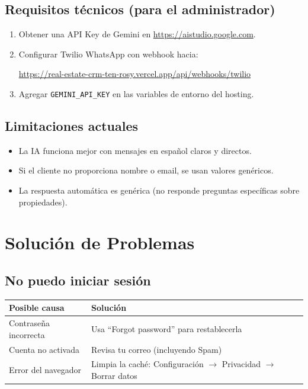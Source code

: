 \documentclass[12pt,oneside]{article}
\begin{document}
\subsection{Requisitos técnicos (para el administrador)}

\begin{enumerate}[leftmargin=*]
  \item Obtener una API Key de Gemini en \url{https://aistudio.google.com}.
  \item Configurar Twilio WhatsApp con webhook hacia:
  \begin{center}
  \url{https://real-estate-crm-ten-rosy.vercel.app/api/webhooks/twilio}
  \end{center}
  \item Agregar \texttt{GEMINI\_API\_KEY} en las variables de entorno del hosting.
\end{enumerate}

\subsection{Limitaciones actuales}

\begin{itemize}[leftmargin=*]
  \item La IA funciona mejor con mensajes en español claros y directos.
  \item Si el cliente no proporciona nombre o email, se usan valores genéricos.
  \item La respuesta automática es genérica (no responde preguntas específicas sobre propiedades).
\end{itemize}

\section{Solución de Problemas}

\subsection{No puedo iniciar sesión}

\begin{tabularx}{\textwidth}{|X|X|}
\hline
\rowcolor{primary!10}
\textbf{Posible causa} & \textbf{Solución} \\
\hline
Contraseña incorrecta & Usa “Forgot password” para restablecerla \\
\hline
Cuenta no activada & Revisa tu correo (incluyendo Spam) \\
\hline
Error del navegador & Limpia la caché: Configuración $\rightarrow$ Privacidad $\rightarrow$ Borrar datos \\
\hline
\end{tabularx}
\end{document}

